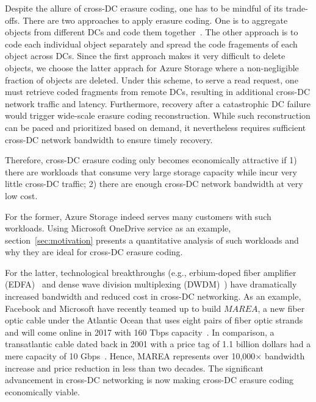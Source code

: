 Despite the allure of cross-DC erasure coding, one has to be mindful of its trade-offs. There are two approaches to apply erasure coding.  One is to aggregate objects from different DCs and code them together~\cite{f4:osdi14}.  The other approach is to code each individual object separately and spread the code fragements of each object across DCs.  Since the first approach makes it 
very difficult to delete objects, we choose the latter apprach for Azure Storage where a non-negligible fraction of objects are deleted. Under this scheme, to serve a read request, one must retrieve coded fragments from remote DCs, resulting in additional cross-DC network traffic and latency. Furthermore, recovery after a catastrophic DC failure would trigger wide-scale erasure coding reconstruction. While such reconstruction can be paced and prioritized based on demand, it nevertheless requires sufficient cross-DC network bandwidth to ensure timely recovery.

Therefore, cross-DC erasure coding only becomes economically attractive if 1) there are workloads that consume very large storage capacity while incur very little cross-DC traffic; 2) there are enough cross-DC network bandwidth at very low cost.

For the former, Azure Storage indeed serves many customers with such workloads. Using Microsoft OneDrive service as an example, section~\ref{sec:motivation} presents a quantitative analysis of such workloads and why they are ideal for cross-DC erasure coding.

For the latter, technological breakthroughs (e.g., erbium-doped fiber amplifier (EDFA)~\cite{mears1986low} and dense wave division multiplexing (DWDM)~\cite{zhu2011112}) have dramatically increased bandwidth and reduced cost in cross-DC networking. As an example, Facebook and Microsoft have recently teamed up to build $MAREA$, a new fiber optic cable under the Atlantic Ocean that uses eight pairs of fiber optic strands and will come online in 2017 with 160 Tbps capacity~\cite{bib:MAREA1, bib:MAREA2}. In comparison, a transatlantic cable dated back in 2001 with a price tag of 1.1 billion dollars had a mere capacity of 10 Gbps~\cite{bib:FA-1}. Hence, MAREA represents over 10,000$\times$ bandwidth increase and price reduction in less than two decades. The significant advancement in cross-DC networking is now making cross-DC erasure coding economically viable.


